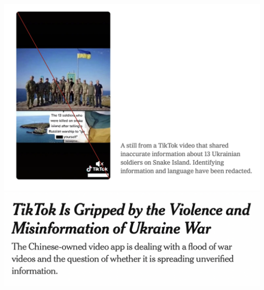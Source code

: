 \documentclass[nobackground,dvipsnames,table,aspectratio=169]{beamer}
\begin{document}
\begin{frame}{}
    \begin{columns}
            \includegraphics[width=\textwidth]{tiktok-misinfo}
            \includegraphics[width=\textwidth]{tiktok-ukraine-nyt}
    \end{columns}
\end{frame}
\end{document}
